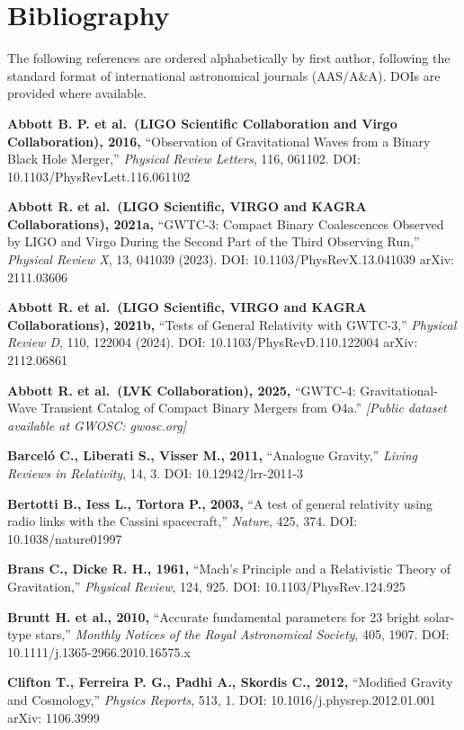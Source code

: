 \documentclass[11pt,a4paper]{article}
\begin{document}
\hypertarget{bibliography}{%
\section*{Bibliography}\label{bibliography}}

The following references are ordered alphabetically by first author,
following the standard format of international astronomical journals
(AAS/A\&A). DOIs are provided where available.

\textbf{Abbott B. P. et al.~(LIGO Scientific Collaboration and Virgo
Collaboration), 2016,} ``Observation of Gravitational Waves from a
Binary Black Hole Merger,'' \emph{Physical Review Letters}, 116, 061102.
DOI: 10.1103/PhysRevLett.116.061102

\textbf{Abbott R. et al.~(LIGO Scientific, VIRGO and KAGRA
Collaborations), 2021a,} ``GWTC-3: Compact Binary Coalescences Observed
by LIGO and Virgo During the Second Part of the Third Observing Run,''
\emph{Physical Review X}, 13, 041039 (2023). DOI:
10.1103/PhysRevX.13.041039 arXiv: 2111.03606

\textbf{Abbott R. et al.~(LIGO Scientific, VIRGO and KAGRA
Collaborations), 2021b,} ``Tests of General Relativity with GWTC-3,''
\emph{Physical Review D}, 110, 122004 (2024). DOI:
10.1103/PhysRevD.110.122004 arXiv: 2112.06861

\textbf{Abbott R. et al.~(LVK Collaboration), 2025,} ``GWTC-4:
Gravitational-Wave Transient Catalog of Compact Binary Mergers from
O4a.'' \emph{{[}Public dataset available at GWOSC: gwosc.org{]}}

\textbf{Barceló C., Liberati S., Visser M., 2011,} ``Analogue Gravity,''
\emph{Living Reviews in Relativity}, 14, 3. DOI: 10.12942/lrr-2011-3

\textbf{Bertotti B., Iess L., Tortora P., 2003,} ``A test of general
relativity using radio links with the Cassini spacecraft,''
\emph{Nature}, 425, 374. DOI: 10.1038/nature01997

\textbf{Brans C., Dicke R. H., 1961,} ``Mach's Principle and a
Relativistic Theory of Gravitation,'' \emph{Physical Review}, 124, 925.
DOI: 10.1103/PhysRev.124.925

\textbf{Bruntt H. et al., 2010,} ``Accurate fundamental parameters for
23 bright solar-type stars,'' \emph{Monthly Notices of the Royal
Astronomical Society}, 405, 1907. DOI: 10.1111/j.1365-2966.2010.16575.x

\textbf{Clifton T., Ferreira P. G., Padhi A., Skordis C., 2012,}
``Modified Gravity and Cosmology,'' \emph{Physics Reports}, 513, 1. DOI:
10.1016/j.physrep.2012.01.001 arXiv: 1106.3999
\end{document}
